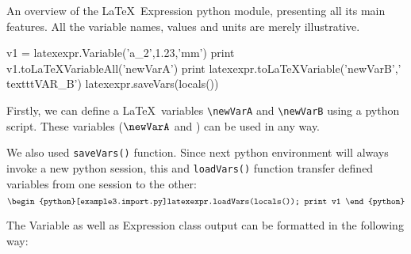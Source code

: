\documentclass{report}
\begin{document}
An overview of the \LaTeX\ Expression python module, presenting all its main features.
All the variable names, values and units are merely illustrative.
\begin{python}
	v1 = latexexpr.Variable('a_2',1.23,'mm')
	print v1.toLaTeXVariableAll('newVarA')
	print latexexpr.toLaTeXVariable('newVarB','\\texttt{VAR\_B}')
	latexexpr.saveVars(locals())
\end{python}

Firstly, we can define a \LaTeX\ variables \texttt{\textbackslash newVarA}
and \texttt{\textbackslash newVarB} using a python script.
These variables ($\newVarA$ and \newVarB) can be used in any way.

We also used \texttt{saveVars()} function.
Since next python environment will always invoke a new python session,
this and \texttt{loadVars()} function transfer defined variables from one session to the other:
$$
\begin{python}[example3.import.py]latexexpr.loadVars(locals()); print v1 \end{python}
$$

The Variable as well as Expression class output can be formatted in the following way:
\end{document}
